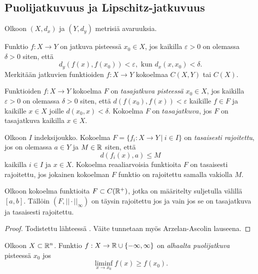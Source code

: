 \documentclass[12pt,oneside,a4paper]{amsbook} %
\begin{document}
\subsection{Puolijatkuvuus ja Lipschitz-jatkuvuus}
Olkoon $(X, d_x)$ ja $(Y, d_y)$ metrisiä avaruuksia.

\begin{definition}Funktio $f: X \to Y$ on jatkuva pisteessä $x_0 \in X$, jos kaikilla $\varepsilon > 0$ on olemassa $\delta > 0$ siten, että
\begin{equation*}
    d_y(f(x), f(x_0)) < \varepsilon, \text{ kun } d_x(x, x_0) < \delta.
\end{equation*}
Merkitään jatkuvien funktioiden $f: X \to Y$ kokoelmaa $C(X, Y)$ tai $C(X)$.
\end{definition}

\begin{definition}
Funktioiden $f:X \to Y$ kokoelma $F$ on \textit{tasajatkuva pisteessä} $x_0 \in X$, jos kaikilla $\varepsilon > 0 $ on olemassa $\delta > 0$ siten, että $d(f(x_0), f(x)) < \varepsilon$ kaikille $f \in F$ ja kaikille $x \in X$ joille $d(x_0, x) < \delta $. Kokoelma $F$ on $tasajatkuva$, jos $F$ on tasajatkuva kaikilla $x \in X$.
\end{definition}

\begin{definition}
    Olkoon $I$ indeksijoukko. Kokoelma $F = \{f_i : X \to Y \ | \ i \in I\}$ on \textit{tasaisesti rajoitettu}, jos on olemassa $a \in Y$ ja $M \in \mathbb{R}$ siten, että
    \begin{equation*}
        d(f_i(x), a) \le M
    \end{equation*} 
    kaikilla $i \in I$ ja $x \in X$.
    Kokoelma reaaliarvoisia funktioita $F$ on tasaisesti rajoitettu, jos jokainen kokoelman $F$ funktio on rajoitettu samalla vakiolla $M$.
\end{definition}

\begin{theorem}\label{thm:ascoli-arzela}
    Olkoon kokoelma funktioita $F \subset C({\mathbb{R}^{+}})$, jotka on määritelty suljetulla välillä $[a, b]$. Tällöin $(F, ||\cdot||_\infty)$ on täysin rajoitettu jos ja vain jos se on tasajatkuva ja tasaisesti rajoitettu.
\end{theorem}
\begin{proof}
    Todistettu lähteessä \cite[s. 158]{rudin}. Väite tunnetaan myös Arzelan-Ascolin lauseena.
\end{proof}

\begin{definition}
    Olkoon $X\subset \mathbb{R}^n$. Funktio $f: X \to \mathbb{R} \cup\{-\infty, \infty\}$ on \textit{alhaalta puolijatkuva} pisteessä $x_0$ jos 
    $$\liminf_{x\to x_0}  f(x) \ge f(x_0).$$
\end{definition}
\end{document}
